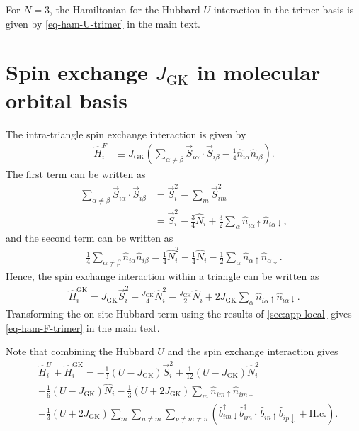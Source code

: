 \documentclass[reprint,aps,prb,amsmath,amssymb]{revtex4-2}
\begin{document}
For $N = 3$, the Hamiltonian for the Hubbard $U$ interaction in the trimer basis is given by \cref{eq-ham-U-trimer} in the main text.


\section{Spin exchange $J_{\mathrm{GK}}$ in molecular orbital basis} \label{sec:app-hunds}

The intra-triangle spin exchange interaction is given by
%
\begin{align}
\hat{H}_i^{F} & \equiv J_{\mathrm{GK}} \left( \sum_{\alpha \neq \beta} \vec{S}_{i \alpha} \cdot \vec{S}_{i \beta} - \frac{1}{4} \hat{n}_{i\alpha} \hat{n}_{i\beta} \right).
\end{align}
%
The first term can be written as
%
\begin{align}
\sum_{\alpha \neq \beta} \vec{S}_{i \alpha} \cdot \vec{S}_{i \beta} & = \vec{S}_i^2 - \sum_m \vec{S}_{im}^2 \nonumber \\
%
& = \vec{S}_i^2 - \frac{3}{4} \hat{N}_i + \frac{3}{2} \sum_{\alpha} \hat{n}_{i\alpha\uparrow} \hat{n}_{i\alpha \downarrow},
\end{align}
%
and the second term can be written as
%
\begin{align}
\frac{1}{4} \sum_{\alpha \neq \beta}  \hat{n}_{i\alpha} \hat{n}_{i\beta} = \frac{1}{4} \hat{N}_i^2 - \frac{1}{4} \hat{N}_i - \frac{1}{2} \sum_{\alpha} \hat{n}_{\alpha \uparrow} \hat{n}_{\alpha \downarrow}.
\end{align}
%
Hence, the spin exchange interaction within a triangle can be written as
%
\begin{align}
\hat{H}_i^{\mathrm{GK}} = J_{\mathrm{GK}} \vec{S}_i^2 - \frac{J_{\mathrm{GK}}}{4} \hat{N}_i^2 - \frac{J_{\mathrm{GK}}}{2} \hat{N}_i + 2 J_{\mathrm{GK}} \sum_{\alpha} \hat{n}_{i\alpha\uparrow} \hat{n}_{i\alpha\downarrow}.
\end{align}
%
Transforming the on-site Hubbard term using the results of \cref{sec:app-local} gives \cref{eq-ham-F-trimer} in the main text.

Note that combining the Hubbard $U$ and the spin exchange interaction gives
%
\begin{align}
& \hat{H}_i^U + \hat{H}_i^{\mathrm{GK}} = -\frac{1}{3}(U - J_{\mathrm{GK}}) \vec{S}_i^2 + \frac{1}{12}(U - J_{\mathrm{GK}}) \hat{N}_i^2 \nonumber \\
%
& + \frac{1}{6} (U - J_{\mathrm{GK}}) \hat{N}_i - \frac{1}{3}(U + 2 J_{\mathrm{GK}}) \sum_{m} \hat{n}_{im\uparrow} \hat{n}_{im\downarrow} \nonumber \\
%
& + \frac{1}{3}(U + 2 J_{\mathrm{GK}}) \sum_{m} \sum_{n \neq m} \sum_{p \neq m \neq n} \left( \hat{b}_{im \downarrow}^{\dagger} \hat{b}_{im \uparrow}^{\dagger} \hat{b}_{in \uparrow}^{} \hat{b}_{ip \downarrow}^{} + \mathrm{H.c.} \right).
\end{align}
\end{document}
